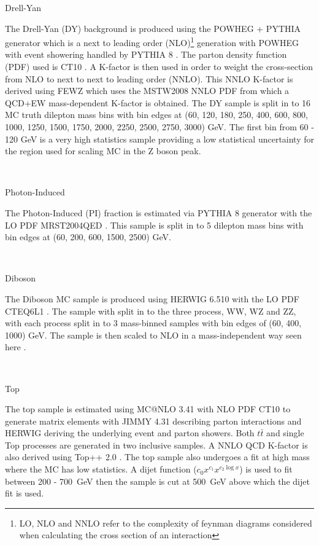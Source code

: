    {\bf\raggedright Drell-Yan}

   {\raggedright The Drell-Yan (DY) background is produced using the POWHEG + PYTHIA generator which is a next to leading order (NLO)\footnote{LO, NLO and NNLO refer to the complexity of feynman diagrams considered when calculating the cross section of an interaction} generation with POWHEG \cite{} with event showering handled by PYTHIA 8 \cite{}. The parton density function (PDF) used is CT10 \cite{}. A K-factor is then used in order to weight the cross-section from NLO to next to next to leading order (NNLO). This NNLO K-factor is derived using FEWZ \cite{} which uses the MSTW2008 NNLO PDF \cite{} from which a QCD+EW mass-dependent K-factor is obtained. The DY sample is split in to 16 MC truth dilepton mass bins with bin edges at (60, 120, 180, 250, 400, 600, 800, 1000, 1250, 1500, 1750, 2000, 2250, 2500, 2750, 3000) GeV. The first bin from 60 - 120 GeV is a very high statistics sample providing a low statistical uncertainty for the region used for scaling MC in the Z boson peak.} \\


   {\bf\raggedright Photon-Induced}

   {\raggedright The Photon-Induced (PI) fraction is estimated via PYTHIA 8 \cite{} generator with the LO PDF MRST2004QED \cite{}. This sample is split in to 5 dilepton mass bins with bin edges at (60, 200, 600, 1500, 2500) GeV.}\\


   {\bf\raggedright Diboson}

   {\raggedright The Diboson MC sample is produced using HERWIG 6.510 \cite{} with the LO PDF CTEQ6L1 \cite{}. The sample with split in to the three process, WW, WZ and ZZ, with each process split in to 3 mass-binned samples with bin edges of (60, 400, 1000) GeV. The sample is then scaled to NLO in a mass-independent way seen here \cite{}.}\\

   {\bf\raggedright Top}

   {\raggedright The top sample is estimated using MC@NLO 3.41 \cite{} with NLO PDF CT10 \cite{} to generate matrix elements with JIMMY 4.31 \cite{} describing parton interactions and HERWIG \cite{} deriving the underlying event and parton showers. Both $t\bar{t}$ and single Top processes are generated in two inclusive samples. A NNLO QCD K-factor is also derived using Top++ 2.0 \cite{}. The top sample also undergoes a fit at high mass where the MC has low statistics. A dijet function ($c_{0}x^{c_{1}} x^{c_{2}\log{x}}$) is used to fit between 200 - 700~GeV then the sample is cut at 500~GeV above which the dijet fit is used.}


